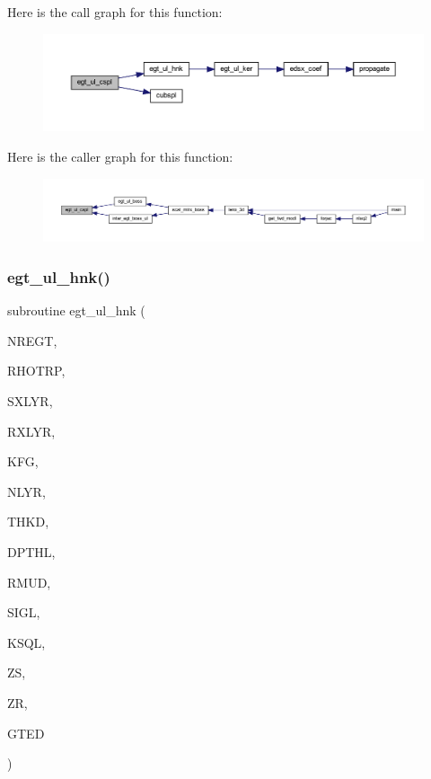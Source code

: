 Here is the call graph for this function\+:\nopagebreak
\begin{figure}[H]
\begin{center}
\leavevmode
\includegraphics[width=350pt]{Leroi_8f90_a55b57146ea180fed3080a010421620fe_cgraph}
\end{center}
\end{figure}
Here is the caller graph for this function\+:\nopagebreak
\begin{figure}[H]
\begin{center}
\leavevmode
\includegraphics[width=350pt]{Leroi_8f90_a55b57146ea180fed3080a010421620fe_icgraph}
\end{center}
\end{figure}
\mbox{\label{Leroi_8f90_a1d1da4021109f56adcc9ad84d89cd1b7}} 
\subsubsection{\texorpdfstring{egt\+\_\+ul\+\_\+hnk()}{egt\_ul\_hnk()}}
{\footnotesize\ttfamily subroutine egt\+\_\+ul\+\_\+hnk (\begin{DoxyParamCaption}\item[{integer}]{N\+R\+E\+GT,  }\item[{real, dimension(nregt)}]{R\+H\+O\+T\+RP,  }\item[{integer}]{S\+X\+L\+YR,  }\item[{integer}]{R\+X\+L\+YR,  }\item[{integer}]{K\+FG,  }\item[{integer}]{N\+L\+YR,  }\item[{real(kind=ql), dimension (nlyr)}]{T\+H\+KD,  }\item[{real(kind=ql), dimension (nlyr)}]{D\+P\+T\+HL,  }\item[{real(kind=ql), dimension(0\+:nlyr)}]{R\+M\+UD,  }\item[{complex(kind=ql), dimension (nlyr)}]{S\+I\+GL,  }\item[{complex(kind=ql), dimension (nlyr)}]{K\+S\+QL,  }\item[{real(kind=ql)}]{ZS,  }\item[{real(kind=ql)}]{ZR,  }\item[{complex(kind=ql), dimension(nregt,7)}]{G\+T\+ED }\end{DoxyParamCaption})}

